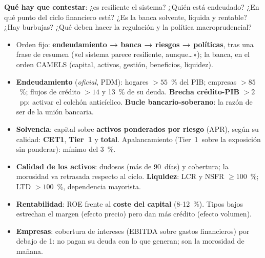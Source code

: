 \documentclass{article}
\begin{document}
\begin{columnas}
\begin{ideaclave}
\textbf{Qué hay que contestar}: ¿es resiliente el sistema? ¿Quién está endeudado? ¿En qué punto del ciclo financiero está? ¿Es la banca solvente, líquida y rentable? ¿Hay burbujas? ¿Qué deben hacer la regulación y la política macroprudencial?
\end{ideaclave}
\begin{itemize}[itemsep=1.5pt]
\item Orden fijo: \textbf{endeudamiento → banca → riesgos → políticas}, tras una frase de resumen («el sistema parece resiliente, aunque…»); la banca, en el orden CAMELS (capital, activos, gestión, beneficios, liquidez).
\item \textbf{Endeudamiento} (\emph{oficial}, PDM): hogares $>55$~\% del PIB; empresas $>85$~\%; flujos de crédito $>14$ y 13~\% de su deuda. \textbf{Brecha crédito-PIB} $>2$~pp: activar el colchón anticíclico. \textbf{Bucle bancario-soberano}: la razón de ser de la unión bancaria.
\item \textbf{Solvencia}: capital sobre \textbf{activos ponderados por riesgo} (APR), según su calidad: \textbf{CET1}, \textbf{Tier~1} y \textbf{total}. Apalancamiento (Tier~1~sobre la exposición sin ponderar): mínimo del 3~\%.
\end{itemize}
\begin{itemize}[itemsep=1.5pt]
\item \textbf{Calidad de los activos}: dudosos (más de 90~días) y cobertura; la morosidad va retrasada respecto al ciclo. \textbf{Liquidez}: LCR y NSFR $\geq100$~\%; LTD $>100$~\%, dependencia mayorista.
\item \textbf{Rentabilidad}: ROE frente al \textbf{coste del capital} (8-12~\%). Tipos bajos estrechan el margen (efecto precio) pero dan más crédito (efecto volumen).
\item \textbf{Empresas}: cobertura de intereses (EBITDA sobre gastos financieros) por debajo de 1: no pagan su deuda con lo que generan; son la morosidad de mañana.
\end{itemize}

\end{columnas}
\end{document}
